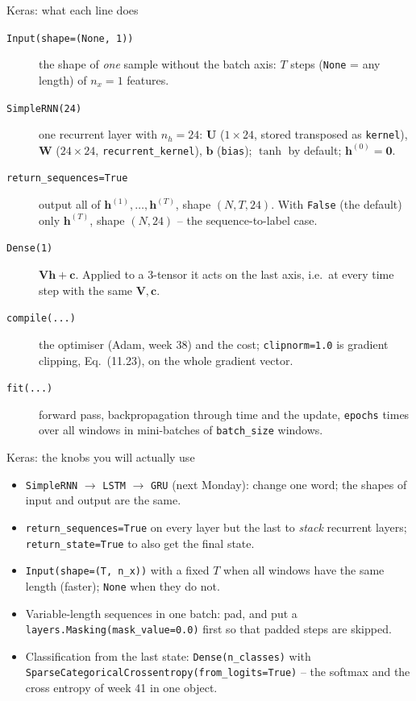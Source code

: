 \documentclass[10pt,aspectratio=169]{beamer}
\begin{document}
\begin{frame}{Keras: what each line does}
\small
\begin{description}
  \item[\texttt{Input(shape=(None, 1))}] the shape of \emph{one} sample
        without the batch axis: $T$ steps (\texttt{None} = any length) of
        $n_x=1$ features.
  \item[\texttt{SimpleRNN(24)}] one recurrent layer with $n_h=24$: $\bm{U}$
        ($1\times24$, stored transposed as \texttt{kernel}), $\bm{W}$
        ($24\times24$, \texttt{recurrent\_kernel}), $\bm{b}$ (\texttt{bias});
        $\tanh$ by default; $\bm{h}^{(0)}=\bm{0}$.
  \item[\texttt{return\_sequences=True}] output all of $\bm{h}^{(1)},\dots,\bm{h}^{(T)}$,
        shape $(N,T,24)$.  With \texttt{False} (the default) only
        $\bm{h}^{(T)}$, shape $(N,24)$ -- the sequence-to-label case.
  \item[\texttt{Dense(1)}] $\bm{V}\bm{h}+\bm{c}$.  Applied to a 3-tensor it
        acts on the last axis, i.e.\ at every time step with the same
        $\bm{V},\bm{c}$.
  \item[\texttt{compile(...)}] the optimiser (Adam, week 38) and the cost;
        \texttt{clipnorm=1.0} is gradient clipping, Eq.~(11.23), on the whole
        gradient vector.
  \item[\texttt{fit(...)}] forward pass, backpropagation through time and the
        update, \texttt{epochs} times over all windows in mini-batches of
        \texttt{batch\_size} windows.
\end{description}
\end{frame}

\begin{frame}{Keras: the knobs you will actually use}
\small
\begin{itemize}
  \item \texttt{SimpleRNN} $\to$ \texttt{LSTM} $\to$ \texttt{GRU} (next
        Monday): change one word; the shapes of input and output are the
        same.
  \item \texttt{return\_sequences=True} on every layer but the last to
        \emph{stack} recurrent layers; \texttt{return\_state=True} to also
        get the final state.
  \item \texttt{Input(shape=(T, n\_x))} with a fixed $T$ when all windows
        have the same length (faster); \texttt{None} when they do not.
  \item Variable-length sequences in one batch: pad, and put a
        \texttt{layers.Masking(mask\_value=0.0)} first so that padded steps
        are skipped.
  \item Classification from the last state: \texttt{Dense(n\_classes)}
        with \texttt{SparseCategoricalCrossentropy(from\_logits=True)} --
        the softmax and the cross entropy of week 41 in one object.
\end{itemize}
\end{frame}
\end{document}
